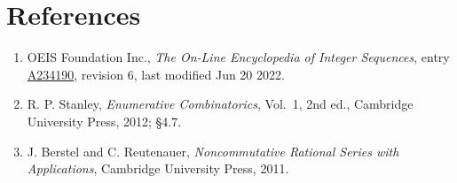 \documentclass[11pt]{article}
\theoremstyle{definition}
\begin{document}
\section{References}

\begin{enumerate}

\item OEIS Foundation Inc., \emph{The On-Line Encyclopedia of Integer Sequences}, entry \href{https://oeis.org/A234190}{A234190}, revision 6, last modified Jun 20 2022.

\item R. P. Stanley, \emph{Enumerative Combinatorics}, Vol.~1, 2nd ed., Cambridge University Press, 2012; \S4.7.

\item J. Berstel and C. Reutenauer, \emph{Noncommutative Rational Series with Applications}, Cambridge University Press, 2011.

\end{enumerate}
\end{document}
